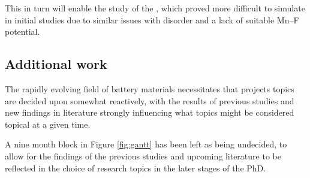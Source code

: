 This in turn will enable the study of the , which proved more difficult to simulate in initial studies due to similar issues with disorder and a lack of suitable Mn--F potential.

\subsection{Additional work}
The rapidly evolving field of battery materials necessitates that projects topics are decided upon somewhat reactively, with the results of previous studies and new findings in literature strongly influencing what topics might be considered topical at a given time.

A nine month block in Figure \ref{fig:gantt} has been left as being undecided, to allow for the findings of the previous studies and upcoming literature to be reflected in the choice of research topics in the later stages of the PhD.
\newpage
